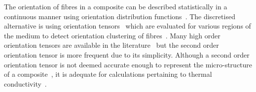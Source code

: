 	The orientation of fibres in a composite can be described statistically in a continuous manner using orientation distribution functions~\autocite{Nomura.1970}. The discretised alternative is using orientation tensors~\autocite{Scheidegger.1965,Advani.1987} which are evaluated for various regions of the medium to detect orientation clustering of fibres~\autocite{Lee.2003,Krause.2010,Sliseris.2016,Yang.2010}. Many high order orientation tensors are available in the literature~\autocite{DuChung.2002} but the second order orientation tensor is more frequent due to its simplicity. Although a second order orientation tensor is not deemed accurate enough to represent the micro-structure of a composite~\autocite{Muller.2016b}, it is adequate for calculations pertaining to thermal conductivity~\autocite{Ranganathan.1990}.
	
